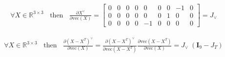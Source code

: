 \documentclass{article}
\newcommand\I{\bm{I}}
\newcommand\Real{\mathbb{R}}
\newcommand\vecop[1]{\text{vec} \left( #1\right)}
\begin{document}
\begin{align}
  \forall X \in \Real^{3 \times 3} \;\; \text{ then } \;\; \frac{\partial X^\vee}{\partial \vecop{X}} =
  \begin{bmatrix}
    0 & 0 & 0 & 0 & 0 & 0 & 0 & -1 & 0 \\
    0 & 0 & 0 & 0 & 0 & 0 & 1 & 0 & 0 \\
    0 & 0 & 0 & 0 & -1 & 0 & 0 & 0 & 0
  \end{bmatrix} = J_\vee
\end{align}

\begin{align}
  \forall X \in \Real^{3 \times 3} \;\; \text{ then } \;\; \frac{\partial (X - X^T)^\vee}{\partial \vecop{X}}
  = \frac{\partial (X - X^T)^\vee}{\partial \vecop{X - X^T}}
  \frac{\partial \vecop{X - X^T}}{\partial \vecop{X}} = J_\vee \; (\I_9 - J_T)
\end{align}


\printbibliography
\end{document}
